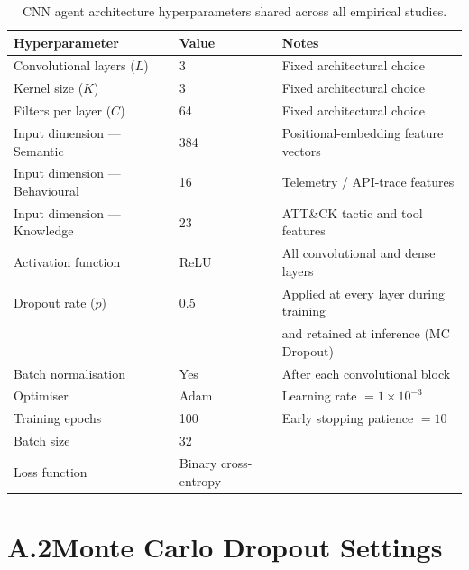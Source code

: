 \begin{table}[ht]
\centering
\caption{CNN agent architecture hyperparameters shared across all empirical studies.}
\label{tab:app_cnn}
\begin{tabular}{@{}lll@{}}
\toprule
\textbf{Hyperparameter} & \textbf{Value} & \textbf{Notes} \\
\midrule
Convolutional layers ($L$)      & 3             & Fixed architectural choice \\
Kernel size ($K$)               & 3             & Fixed architectural choice \\
Filters per layer ($C$)         & 64            & Fixed architectural choice \\
Input dimension — Semantic      & 384           & Positional-embedding feature vectors \\
Input dimension — Behavioural   & 16            & Telemetry / API-trace features \\
Input dimension — Knowledge     & 23            & ATT\&CK tactic and tool features \\
Activation function             & ReLU          & All convolutional and dense layers \\
Dropout rate ($p$)              & 0.5           & Applied at every layer during training \\
                                &               & and retained at inference (MC Dropout) \\
Batch normalisation             & Yes           & After each convolutional block \\
Optimiser                       & Adam          & Learning rate $= 1\times10^{-3}$ \\
Training epochs                 & 100           & Early stopping patience $= 10$ \\
Batch size                      & 32            & \\
Loss function                   & Binary cross-entropy & \\
\bottomrule
\end{tabular}
\end{table}

\section*{A.2\quad Monte Carlo Dropout Settings}

